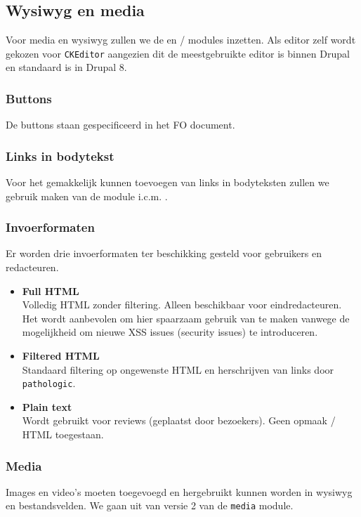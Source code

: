 \subsection{Wysiwyg en media}\label{wysiwyg}

Voor media en wysiwyg zullen we de  en  /  modules inzetten. Als editor zelf wordt gekozen voor \texttt{CKEditor} aangezien dit de meestgebruikte editor is binnen Drupal en standaard is in Drupal 8.

\subsubsection{Buttons}

De buttons staan gespecificeerd in het FO document.

\subsubsection{Links in bodytekst}

Voor het gemakkelijk kunnen toevoegen van links in bodyteksten zullen we gebruik maken van de  module i.c.m. .

\subsubsection{Invoerformaten}\label{invoerformaten}

Er worden drie invoerformaten ter beschikking gesteld voor gebruikers en redacteuren.

\begin{itemize}
\item \textbf{Full HTML} \\
Volledig HTML zonder filtering. Alleen beschikbaar voor eindredacteuren. Het wordt aanbevolen om hier spaarzaam gebruik van te maken vanwege de mogelijkheid om nieuwe XSS issues (security issues) te introduceren.
\item \textbf{Filtered HTML} \\
Standaard filtering op ongewenste HTML en herschrijven van links door \texttt{pathologic}.
\item \textbf{Plain text} \\
Wordt gebruikt voor reviews (geplaatst door bezoekers). Geen opmaak / HTML toegestaan.
\end{itemize}

\subsubsection{Media}\label{media}

Images en video's moeten toegevoegd en hergebruikt kunnen worden in wysiwyg en bestandsvelden.
We gaan uit van versie 2 van de \texttt{media} module.


